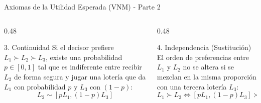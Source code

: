 \documentclass[aspectratio=169, 10pt]{beamer}
\begin{document}
\begin{frame}{Axiomas de la Utilidad Esperada (VNM) - Parte 2}
    \begin{columns}[T]
        \begin{column}{0.48\textwidth}
            \begin{exampleblock}{3. Continuidad}
                Si el decisor prefiere $L_1 \succ L_2 \succ L_3$, existe una probabilidad $p \in [0, 1]$ tal que es indiferente entre recibir $L_2$ de forma segura y jugar una lotería que da $L_1$ con probabilidad $p$ y $L_3$ con $(1-p)$:
                \begin{equation*}
                    L_2 \sim [p L_1, (1-p) L_3]
                \end{equation*}
            \end{exampleblock}
        \end{column}
        
        \begin{column}{0.48\textwidth}
            \begin{exampleblock}{4. Independencia (Sustitución)}
                El orden de preferencias entre $L_1$ y $L_2$ no se altera si se mezclan en la misma proporción con una tercera lotería $L_3$:
                \begin{equation*}
                    L_1 \succ L_2 \iff [p L_1, (1-p) L_3] \succ [p L_2, (1-p) L_3]
                \end{equation*}
            \end{exampleblock}
        \end{column}
    \end{columns}
\end{frame}
\end{document}
